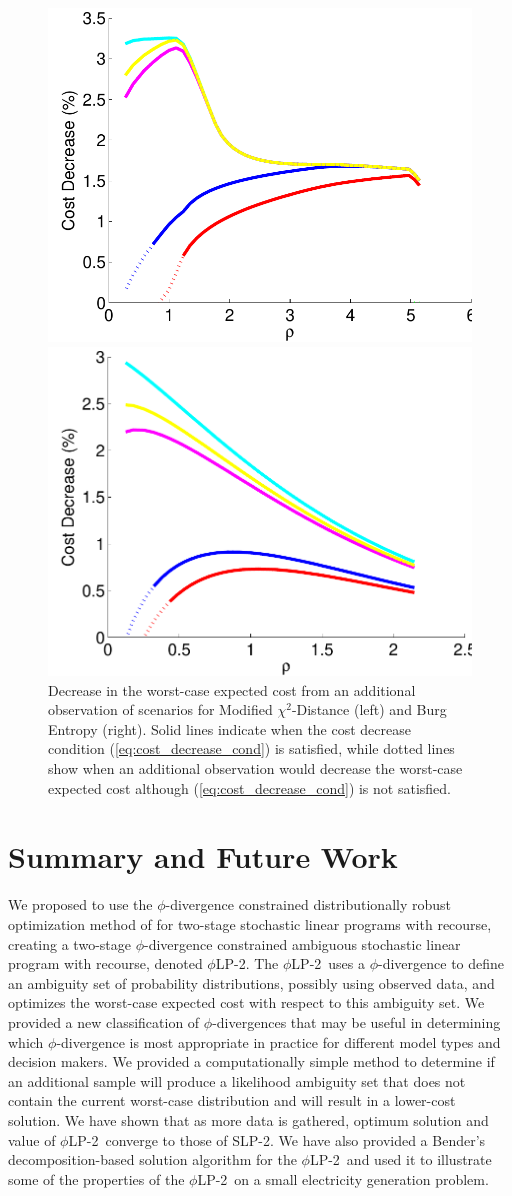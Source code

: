 \documentclass[ijoc,letterpaper]{informs3} %
\newcommand{\plp}{$\phi$LP-2}
\begin{document}
\begin{figure}
	\FIGURE
	{%
		\includegraphics*[width=.45\textwidth]{images/mchi2_decrease_condition}%
		\includegraphics*[width=.45\textwidth]{images/burg_decrease_condition}%
	}
	{
		Decrease in the worst-case expected cost from an additional observation of scenarios for Modified $\chi^2$-Distance (left) and Burg Entropy (right).
		Solid lines indicate when the cost decrease condition (\ref{eq:cost_decrease_cond}) is satisfied, while dotted lines show when an additional observation would decrease the worst-case expected cost although (\ref{eq:cost_decrease_cond}) is not satisfied.
		\label{fig:value}
	}
	{}
\end{figure}

\section{Summary and Future Work}
\label{sec:concl}

We proposed to use the $\phi$-divergence constrained distributionally robust optimization method of \cite{bental2011robust} for two-stage stochastic linear programs with recourse, creating a two-stage $\phi$-divergence constrained ambiguous stochastic linear program with recourse, denoted \plp.
The \plp\ uses a $\phi$-divergence to define an ambiguity set of probability distributions, possibly using observed data, and optimizes the worst-case expected cost with respect to this ambiguity set.
We provided a new classification of $\phi$-divergences that may be useful in determining which $\phi$-divergence is most appropriate in practice for different model types and decision makers.
We provided a computationally simple method to determine if an additional sample will produce a likelihood ambiguity set that does not contain the current worst-case distribution and will result in a lower-cost solution.
We have shown that as more data is gathered, optimum solution and value of \plp\ converge to those of SLP-2. 
We have also provided a Bender's decomposition-based solution algorithm for the \plp\ and used it to illustrate some of the properties of the \plp\ on a small electricity generation problem.
\end{document}
